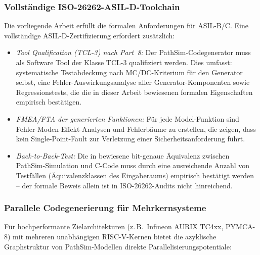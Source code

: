 ﻿\documentclass[12pt,a4paper]{article}
\theoremstyle{definition}
\begin{document}
\subsubsection{Vollständige ISO-26262-ASIL-D-Toolchain}

Die vorliegende Arbeit erfüllt die formalen Anforderungen für ASIL-B/C.
Eine vollständige ASIL-D-Zertifizierung erfordert zusätzlich:

\begin{itemize}
  \item \emph{Tool Qualification (TCL-3) nach Part~8:} Der PathSim-Codegenerator
        muss als Software Tool der Klasse TCL-3 qualifiziert werden. Dies
        umfasst: systematische Testabdeckung nach MC/DC-Kriterium für
        den Generator selbst, eine Fehler-Auswirkungsanalyse aller
        Generator-Komponenten sowie Regressionstests, die die in dieser
        Arbeit bewiesenen formalen Eigenschaften empirisch bestätigen.

  \item \emph{FMEA/FTA der generierten Funktionen:} Für jede
        Model-Funktion sind Fehler-Moden-Effekt-Analysen und
        Fehlerbäume zu erstellen, die zeigen, dass kein Single-Point-Fault
        zur Verletzung einer Sicherheitsanforderung führt.

  \item \emph{Back-to-Back-Test:} Die in  bewiesene
        bit-genaue Äquivalenz zwischen PathSim-Simulation und C-Code muss
        durch eine ausreichende Anzahl von Testfällen (Äquivalenzklassen
        des Eingaberaums) empirisch bestätigt werden -- der formale
        Beweis allein ist in ISO-26262-Audits nicht hinreichend.
\end{itemize}

\subsubsection{Parallele Codegenerierung für Mehrkernsysteme}

Für hochperformante Zielarchitekturen (z.\,B.\ Infineon AURIX TC4xx,
PYMCA-8) mit mehreren unabhängigen RISC-V-Kernen bietet die azyklische
Graphstruktur von PathSim-Modellen direkte Parallelisierungspotentiale:
\end{document}
